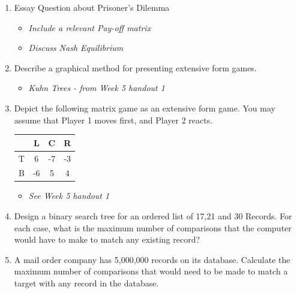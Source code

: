 \documentclass[]{report}
\begin{document}
\begin{enumerate}
	
\item Essay Question about Prisoner's Dilemma
\begin{itemize}
\item \textit{Include a relevant Pay-off matrix}
\item \textit{Discuss Nash Equilibrium}
\end{itemize}
\item Describe a graphical method for presenting extensive form games.

\begin{itemize}

\item \textit{Kuhn Trees - from Week 5 handout 1}

\end{itemize}

\item Depict the following matrix game as an extensive form game. You may assume that Player 1 moves first, and Player 2 reacts.

\begin{center}
\begin{tabular}{|c|c|c|c|} \hline 
   &    L  &  C  & R \\ \hline 
T  &    6  &  -7  & -3 \\ \hline
B  &   -6  &   5  &  4 \\ \hline
\end{tabular}
\end{center}
\begin{itemize}
	
	\item \textit{See Week 5 handout 1}
	
\end{itemize}
\item Design a binary search tree for an ordered list of 17,21 and 30 Records. For each case, what is the maximum number of comparisons that the computer would have to make to match any existing record?

\item A mail order company has 5,000,000 records on its database. Calculate the maximum number of comparisons that would need to be made to match a target with any record in the database. 
\begin{itemize}


\end{itemize}
\end{enumerate}
\end{document}
